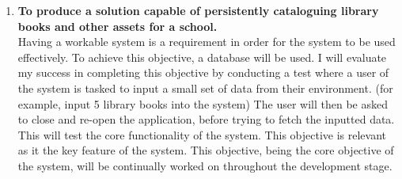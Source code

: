 \documentclass[../../../main.tex]{subfiles}
\begin{document}
\begin{enumerate}
      \item \textbf{To produce a solution capable of persistently cataloguing library books and other assets for a school.}\\
            Having a workable system is a requirement in order for the system to be used effectively.
            To achieve this objective, a database will be used.
            I will evaluate my success in completing this objective by conducting a test where a user of the system is
            tasked to input a small set of data from their environment. (for example, input 5 library books into the system)
            The user will then be asked to close and re-open the application, before trying to fetch the inputted data.
            This will test the core functionality of the system. This objective is relevant as it the key feature of the system.
            This objective, being the core objective of the system, will be continually worked on throughout the development stage.


\end{enumerate}
\end{document}
